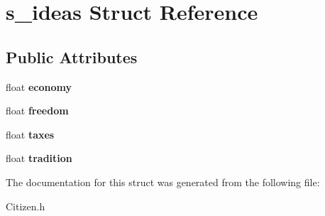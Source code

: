 \hypertarget{structs__ideas}{\section{s\+\_\+ideas Struct Reference}
\label{structs__ideas}
}
\subsection*{Public Attributes}
\begin{DoxyCompactItemize}
\item 
\hypertarget{structs__ideas_a53d529ca607242cc14489be033474c9e}{float {\bfseries economy}}\label{structs__ideas_a53d529ca607242cc14489be033474c9e}

\item 
\hypertarget{structs__ideas_aaf9154f9e53f7959eb3e046181770035}{float {\bfseries freedom}}\label{structs__ideas_aaf9154f9e53f7959eb3e046181770035}

\item 
\hypertarget{structs__ideas_ab0121973d39415038d9acc8169dde4c1}{float {\bfseries taxes}}\label{structs__ideas_ab0121973d39415038d9acc8169dde4c1}

\item 
\hypertarget{structs__ideas_aed8682e418bc2d5619269a1017c98382}{float {\bfseries tradition}}\label{structs__ideas_aed8682e418bc2d5619269a1017c98382}

\end{DoxyCompactItemize}


The documentation for this struct was generated from the following file\+:\begin{DoxyCompactItemize}
\item 
Citizen.\+h\end{DoxyCompactItemize}
